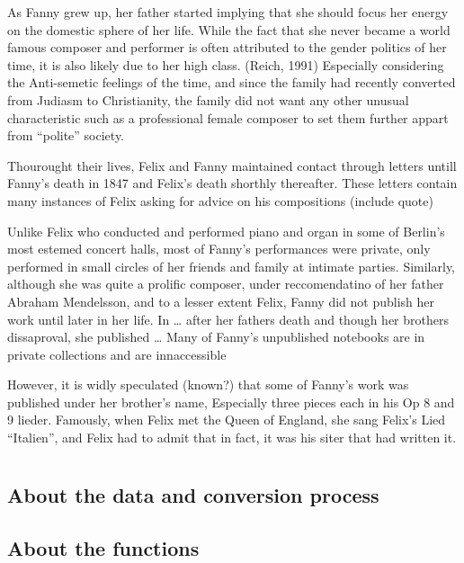 \documentclass[12pt,twoside]{reedthesis}
\theoremstyle{definition}
\theoremstyle{definition}
\theoremstyle{definition}
\theoremstyle{remark}
\begin{document}
As Fanny grew up, her father started implying that she should focus her
energy on the domestic sphere of her life. While the fact that she never
became a world famous composer and performer is often attributed to the
gender politics of her time, it is also likely due to her high class.
(Reich, 1991) Especially considering the Anti-semetic feelings of the
time, and since the family had recently converted from Judiasm to
Christianity, the family did not want any other unusual characteristic
such as a professional female composer to set them further appart from
``polite'' society.

Thourought their lives, Felix and Fanny maintained contact through
letters untill Fanny's death in 1847 and Felix's death shorthly
thereafter. These letters contain many instances of Felix asking for
advice on his compositions (include quote)

Unlike Felix who conducted and performed piano and organ in some of
Berlin's most estemed concert halls, most of Fanny's performances were
private, only performed in small circles of her friends and family at
intimate parties. Similarly, although she was quite a prolific composer,
under reccomendatino of her father Abraham Mendelsson, and to a lesser
extent Felix, Fanny did not publish her work until later in her life. In
\ldots{} after her fathers death and though her brothers dissaproval,
she published \ldots{} Many of Fanny's unpublished notebooks are in
private collections and are innaccessible

However, it is widly speculated (known?) that some of Fanny's work was
published under her brother's name, Especially three pieces each in his
Op 8 and 9 lieder. Famously, when Felix met the Queen of England, she
sang Felix's Lied ``Italien'', and Felix had to admit that in fact, it
was his siter that had written it.

\chapter{}\label{section-1}

\section{About the data and conversion
process}\label{about-the-data-and-conversion-process}

\section{About the functions}\label{about-the-functions}
\end{document}
